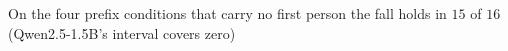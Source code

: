 On the four prefix conditions that carry no first person the fall holds in $15$ of $16$ (Qwen2.5-1.5B's interval covers zero)